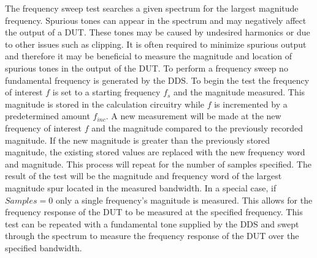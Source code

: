 \documentclass[12pt]{report}
\begin{document}
The frequency sweep test searches a given spectrum for the largest magnitude frequency.  Spurious tones can appear in the spectrum and may negatively affect the output of a DUT.  These tones may be caused by undesired harmonics or due to other issues such as clipping.  It is often required to minimize spurious output and therefore it may be beneficial to measure the magnitude and location of spurious tones in the output of the DUT\cite{joey}.  To perform a frequency sweep no fundamental frequency is generated by the DDS.  To begin the test the frequency of interest $f$ is set to a starting frequency $f_s$ and the magnitude measured.  This magnitude is stored in the calculation circuitry while $f$ is incremented by a predetermined amount $f_{inc}$.  A new measurement will be made at the new frequency of interest $f$ and the magnitude compared to the previously recorded magnitude.  If the new magnitude is greater than the previously stored magnitude, the existing stored values are replaced with the new frequency word and magnitude.  This process will repeat for the number of samples specified.  The result of the test will be the magnitude and frequency word of the largest magnitude spur located in the measured bandwidth\cite{joey}.  In a special case, if $Samples = 0$ only a single frequency's magnitude is measured.  This allows for the frequency response of the DUT to be measured at the specified frequency.  This test can be repeated with a fundamental tone supplied by the DDS and swept through the spectrum to measure the frequency response of the DUT over the specified bandwidth\cite{basessa}.
\end{document}
